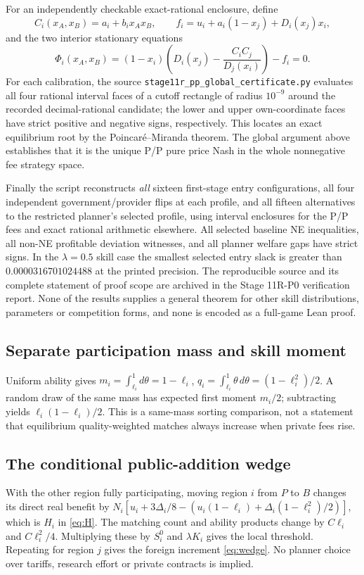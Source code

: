\documentclass[11pt]{article}
\begin{document}
For an independently checkable exact-rational enclosure, define
\[
 C_i(x_A,x_B)=a_i+b_ix_Ax_B,\qquad
 f_i=u_i+a_i(1-x_j)+D_i(x_j)x_i,
\]
and the two interior stationary equations
\[
 \Phi_i(x_A,x_B)
 =(1-x_i)\left(D_i(x_j)-\frac{C_iC_j}{D_j(x_i)}\right)-f_i=0.
\]
For each calibration, the source \texttt{stage11r\_pp\_global\_certificate.py} evaluates all four rational interval faces of a cutoff rectangle of radius $10^{-9}$ around the recorded decimal-rational candidate; the lower and upper own-coordinate faces have strict positive and negative signs, respectively. This locates an exact equilibrium root by the Poincar\'e--Miranda theorem. The global argument above establishes that it is the unique P/P pure price Nash in the whole nonnegative fee strategy space.

Finally the script reconstructs \emph{all} sixteen first-stage entry configurations, all four independent government/provider flips at each profile, and all fifteen alternatives to the restricted planner's selected profile, using interval enclosures for the P/P fees and exact rational arithmetic elsewhere. All selected baseline NE inequalities, all non-NE profitable deviation witnesses, and all planner welfare gaps have strict signs. In the $\lambda=0.5$ skill case the smallest selected entry slack is greater than $0.0000316701024488$ at the printed precision. The reproducible source and its complete statement of proof scope are archived in the Stage 11R-P0 verification report. None of the results supplies a general theorem for other skill distributions, parameters or competition forms, and none is encoded as a full-game Lean proof.

\subsection{Separate participation mass and skill moment}
Uniform ability gives $m_i=\int_{\ell_i}^1d\theta=1-\ell_i$,
$q_i=\int_{\ell_i}^1\theta\,d\theta=(1-\ell_i^2)/2$. A random draw of the same mass has expected first moment $m_i/2$; subtracting yields $\ell_i(1-\ell_i)/2$. This is a same-mass sorting comparison, not a statement that equilibrium quality-weighted matches always increase when private fees rise.

\subsection{The conditional public-addition wedge}
With the other region fully participating, moving region $i$ from $P$ to $B$ changes its direct real benefit by $N_i[u_i+3\Delta_i/8-(u_i(1-\ell_i)+\Delta_i(1-\ell_i^2)/2)]$, which is $H_i$ in \eqref{eq:H}. The matching count and ability products change by $C\ell_i$ and $C\ell_i^2/4$. Multiplying these by $S_i^0$ and $\lambda K_i$ gives the local threshold. Repeating for region $j$ gives the foreign increment \eqref{eq:wedge}. No planner choice over tariffs, research effort or private contracts is implied.
\end{document}
